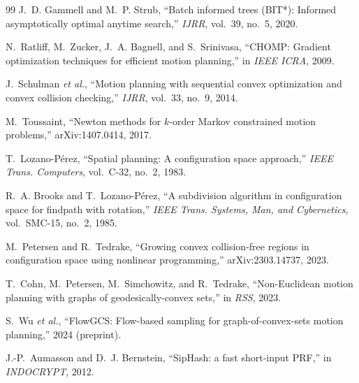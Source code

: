 \documentclass[journal]{IEEEtran}
\newcommand{\etal}{\textit{et al.}}
\begin{document}
\begin{thebibliography}{99}
J.~D. Gammell and M.~P. Strub, ``Batch informed trees (BIT*): Informed asymptotically optimal anytime search,'' \emph{IJRR}, vol.~39, no.~5, 2020.

N.~Ratliff, M.~Zucker, J.~A. Bagnell, and S.~Srinivasa, ``CHOMP: Gradient optimization techniques for efficient motion planning,'' in \emph{IEEE ICRA}, 2009.

J.~Schulman \etal, ``Motion planning with sequential convex optimization and convex collision checking,'' \emph{IJRR}, vol.~33, no.~9, 2014.

M.~Toussaint, ``Newton methods for $k$-order Markov constrained motion problems,'' arXiv:1407.0414, 2017.

T.~Lozano-P\'erez, ``Spatial planning: A configuration space approach,''
\emph{IEEE Trans. Computers}, vol.~C-32, no.~2, 1983.

R.~A. Brooks and T.~Lozano-P\'erez, ``A subdivision algorithm in
configuration space for findpath with rotation,'' \emph{IEEE Trans.
Systems, Man, and Cybernetics}, vol.~SMC-15, no.~2, 1985.

M.~Petersen and R.~Tedrake, ``Growing convex collision-free regions in
configuration space using nonlinear programming,'' arXiv:2303.14737, 2023.

T.~Cohn, M.~Petersen, M.~Simchowitz, and R.~Tedrake, ``Non-Euclidean motion
planning with graphs of geodesically-convex sets,'' in \emph{RSS}, 2023.

S.~Wu \etal, ``FlowGCS: Flow-based sampling for graph-of-convex-sets motion
planning,'' 2024 (preprint).

J.-P.~Aumasson and D.~J. Bernstein, ``SipHash: a fast short-input PRF,''
in \emph{INDOCRYPT}, 2012.

\end{thebibliography}
\end{document}

